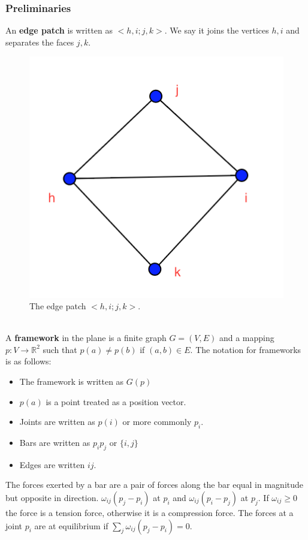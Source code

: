 \documentclass[english]{article}
\newcommand{\R}{\mathbb{R}}
\begin{document}
\subsubsection{Preliminaries}
An \textbf{edge patch} is written as $<h,i;j,k>$. We say it joins the vertices $h,i$ and separates the faces $j,k$.
\begin{figure}[h]
      \centering
      \includegraphics[scale=.3]{edge_patch}       
      \caption{The edge patch $<h,i;j,k>$.}
      \label{fig: Figure 4}
  \end{figure}\\
  
A \textbf{framework} in the plane is a finite graph $G=(V,E)$ and a mapping $p: V \rightarrow \R^2$ such that $p(a) \neq p(b)$ if $(a,b) \in E$. The notation for frameworks is as follows: 

\begin{itemize}
	\item The framework is written as $G(p)$
	\item $p(a)$ is a point treated as a position vector. 
	\item Joints are written as $p(i)$ or more commonly $p_i$.
	\item Bars are written as $p_ip_j$ or $\{i,j\}$
	\item Edges are written $ij$.
\end{itemize}

The forces exerted by a bar are a pair of forces along the bar equal in magnitude but opposite in direction. $\omega_{ij}(p_j - p_i)$ at $p_i$ and $\omega_{ij}(p_i - p_j)$ at $p_j$. If $\omega_{ij} \geq 0$ the force is a tension force, otherwise it is a compression force. The forces at a joint $p_i$ are at equilibrium if $\sum_j \omega_{ij}(p_j-p_i) = 0$.
\end{document}
